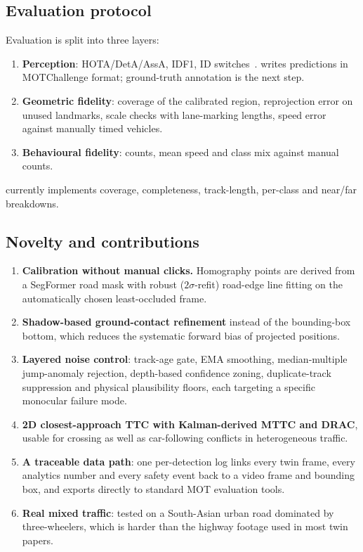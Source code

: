 \documentclass[11pt,a4paper]{article}
\DeclareRobustCommand{\file}[1]{\texttt{\detokenize{#1}}}
\begin{document}
\subsection{Evaluation protocol}
Evaluation is split into three layers:
\begin{enumerate}[nosep]
  \item \textbf{Perception}: HOTA/DetA/AssA, IDF1, ID switches~\cite{luiten2021,ristani2016}. \file{trackeval_export.py}
        writes predictions in MOTChallenge format; ground-truth annotation is the next step.
  \item \textbf{Geometric fidelity}: coverage of the calibrated region, reprojection error on unused landmarks, scale checks with
        lane-marking lengths, speed error against manually timed vehicles.
  \item \textbf{Behavioural fidelity}: counts, mean speed and class mix against manual counts.
\end{enumerate}
\file{eval.py} currently implements coverage, completeness, track-length, per-class and near/far breakdowns.

\subsection{Novelty and contributions}
\begin{enumerate}[nosep]
  \item \textbf{Calibration without manual clicks.} Homography points are derived from a SegFormer road mask with robust
        ($2\sigma$-refit) road-edge line fitting on the automatically chosen least-occluded frame.
  \item \textbf{Shadow-based ground-contact refinement} instead of the bounding-box bottom, which reduces the systematic
        forward bias of projected positions.
  \item \textbf{Layered noise control}: track-age gate, EMA smoothing, median-multiple jump-anomaly rejection, depth-based
        confidence zoning, duplicate-track suppression and physical plausibility floors, each targeting a specific
        monocular failure mode.
  \item \textbf{2D closest-approach TTC with Kalman-derived MTTC and DRAC}, usable for crossing as well as car-following
        conflicts in heterogeneous traffic.
  \item \textbf{A traceable data path}: one per-detection log links every twin frame, every analytics number and every
        safety event back to a video frame and bounding box, and exports directly to standard MOT evaluation tools.
  \item \textbf{Real mixed traffic}: tested on a South-Asian urban road dominated by three-wheelers, which is harder than the
        highway footage used in most twin papers.
\end{enumerate}
\end{document}
